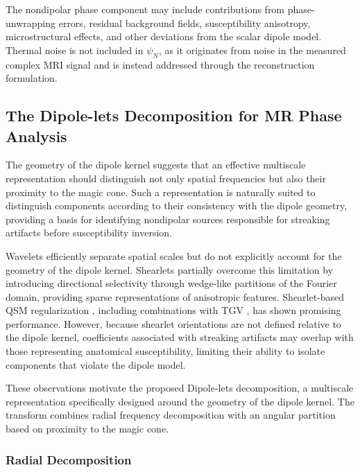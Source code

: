 \documentclass{article}
\begin{document}
The nondipolar phase component may include contributions from phase-unwrapping errors, residual background fields, susceptibility anisotropy, microstructural effects, and other deviations from the scalar dipole model. Thermal noise is not included in $\psi_N$, as it originates from noise in the measured complex MRI signal and is instead addressed through the reconstruction formulation.
\subsection{The Dipole-lets Decomposition for MR Phase Analysis}\label{sec:theoryDecomposition}
The geometry of the dipole kernel suggests that an effective multiscale representation should distinguish not only spatial frequencies but also their proximity to the magic cone. Such a representation is naturally suited to distinguish components according to their consistency with the dipole geometry, providing a basis for identifying nondipolar sources responsible for streaking artifacts before susceptibility inversion.

Wavelets efficiently separate spatial scales but do not explicitly account for the geometry of the dipole kernel. Shearlets partially overcome this limitation by introducing directional selectivity through wedge-like partitions of the Fourier domain, providing sparse representations of anisotropic features. Shearlet-based QSM regularization \cite{stiegeler2020shearlet}, including combinations with TGV \cite{stiegeler2021shearlet}, has shown promising performance. However, because shearlet orientations are not defined relative to the dipole kernel, coefficients associated with streaking artifacts may overlap with those representing anatomical susceptibility, limiting their ability to isolate components that violate the dipole model.

These observations motivate the proposed Dipole-lets decomposition, a multiscale representation specifically designed around the geometry of the dipole kernel. The transform combines radial frequency decomposition with an angular partition based on proximity to the magic cone.


\subsubsection{Radial Decomposition}\label{sec:theoryRadial}
\end{document}
